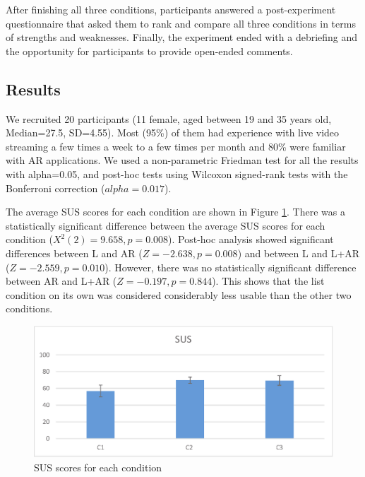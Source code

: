 
After finishing all three conditions, participants answered a post-experiment questionnaire that asked them to rank and compare all three conditions in terms of strengths and weaknesses. Finally, the experiment ended with a debriefing and the opportunity for participants to provide open-ended comments.



\subsection{Results}

We recruited 20 participants (11 female, aged between 19 and 35 years old, Median=27.5, SD=4.55). Most (95\%) of them had experience with live video streaming a few times a week to a few times per month and 80\% were familiar with AR applications. We used a non-parametric Friedman test for all the results with alpha=0.05, and post-hoc tests using Wilcoxon signed-rank tests with the Bonferroni correction ($alpha=0.017$).

The average SUS scores for each condition are shown in Figure \ref{fig:mgia16:questions_sus}. There was a statistically significant difference between the average SUS scores for each condition ($X^2(2)=9.658, p=0.008$). Post-hoc analysis showed significant differences between L and AR ($Z=-2.638, p=0.008$) and between L and L+AR ($Z=-2.559, p=0.010$). However, there was no statistically significant difference between AR and L+AR ($Z=-0.197, p=0.844$). This shows that the list condition on its own was considered considerably less usable than the other two conditions.


\begin{figure}[ht]
  \centering
  \includegraphics[width=.8\linewidth]{images/mgia16/sus.eps}
  \caption{SUS scores for each condition}
  \label{fig:mgia16:questions_sus}
\end{figure}

